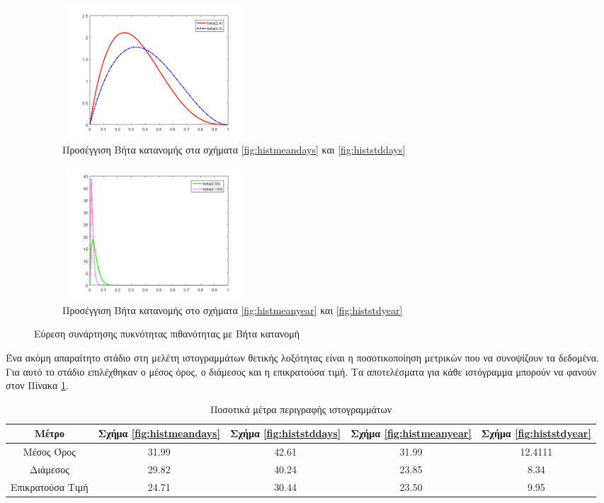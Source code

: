 \begin{figure}[ht!]
 \begin{subfigure}[b]{0.5\textwidth}
 \includegraphics[width=70mm, height=50mm]{../../plots/Consumption_Analysis/beta_days_plot.png}
\caption{Προσέγγιση Βήτα κατανομής στα σχήματα \ref{fig:histmeandays} και \ref{fig:histstddays}}
\label{fig:betadays}
 \end{subfigure}
 \quad
 \begin{subfigure}[b]{0.5\textwidth}
 \includegraphics[width=70mm, height=50mm]{../../plots/Consumption_Analysis/beta_year_plot.png}
\caption{Προσέγγιση Βήτα κατανομής στο σχήματα \ref{fig:histmeanyear} και \ref{fig:histstdyear}}
\label{fig:betadays}
 \end{subfigure}
	\caption{Εύρεση συνάρτησης πυκνότητας πιθανότητας με Βήτα κατανομή}
	\label{fig:betapdfs}
	\end{figure}

Ένα ακόμη απαραίτητο στάδιο στη μελέτη ιστογραμμάτων θετικής λοξότητας είναι η ποσοτικοποίηση μετρικών που να συνοψίζουν τα δεδομένα. Για αυτό το στάδιο επιλέχθηκαν ο μέσος όρος, ο διάμεσος και η επικρατούσα τιμή. Τα αποτελέσματα για κάθε ιστόγραμμα μπορούν να φανούν στον Πίνακα \ref{tab:metricshist}.
\begin{center}
\begin{table}[ht!]
\begin{tabular}{ |c|c|c|c|c| }
 \hline
 Μέτρο & Σχήμα \ref{fig:histmeandays} & Σχήμα \ref{fig:histstddays} & Σχήμα \ref{fig:histmeanyear} & Σχήμα \ref{fig:histstdyear}\\
 \hline
 Μέσος Όρος   		&   31.99  & 42.61 &31.99 &12.4111\\
 \hline
  Διάμεσος   		&   29.82  & 40.24 &23.85 &8.34\\ 
  \hline
  Επικρατούσα Τιμή  &   24.71  & 30.44 &23.50&9.95\\ 
   \hline
\end{tabular}
\caption{Ποσοτικά μέτρα περιγραφής ιστογραμμάτων}
\label{tab:metricshist}
\end{table}
\end{center}

